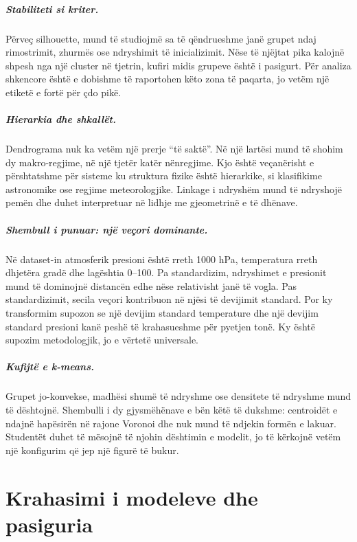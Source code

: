 \documentclass[12pt,a4paper,oneside]{book}
\begin{document}
\paragraph{Stabiliteti si kriter.}
Përveç silhouette, mund të studiojmë sa të qëndrueshme janë grupet ndaj rimostrimit, zhurmës ose ndryshimit të inicializimit. Nëse të njëjtat pika kalojnë shpesh nga një cluster në tjetrin, kufiri midis grupeve është i pasigurt. Për analiza shkencore është e dobishme të raportohen këto zona të paqarta, jo vetëm një etiketë e fortë për çdo pikë.

\paragraph{Hierarkia dhe shkallët.}
Dendrograma nuk ka vetëm një prerje ``të saktë''. Në një lartësi mund të shohim dy makro-regjime, në një tjetër katër nënregjime. Kjo është veçanërisht e përshtatshme për sisteme ku struktura fizike është hierarkike, si klasifikime astronomike ose regjime meteorologjike. Linkage i ndryshëm mund të ndryshojë pemën dhe duhet interpretuar në lidhje me gjeometrinë e të dhënave.

\paragraph{Shembull i punuar: një veçori dominante.}
Në dataset-in atmosferik presioni është rreth 1000 hPa, temperatura rreth dhjetëra gradë dhe lagështia 0--100. Pa standardizim, ndryshimet e presionit mund të dominojnë distancën edhe nëse relativisht janë të vogla. Pas standardizimit, secila veçori kontribuon në njësi të devijimit standard. Por ky transformim supozon se një devijim standard temperature dhe një devijim standard presioni kanë peshë të krahasueshme për pyetjen tonë. Ky është supozim metodologjik, jo e vërtetë universale.

\paragraph{Kufijtë e k-means.}
Grupet jo-konvekse, madhësi shumë të ndryshme ose densitete të ndryshme mund të dështojnë. Shembulli i dy gjysmëhënave e bën këtë të dukshme: centroidët e ndajnë hapësirën në rajone Voronoi dhe nuk mund të ndjekin formën e lakuar. Studentët duhet të mësojnë të njohin dështimin e modelit, jo të kërkojnë vetëm një konfigurim që jep një figurë të bukur.

\chapter[Modelet dhe pasiguria]{Krahasimi i modeleve dhe pasiguria}
\end{document}
